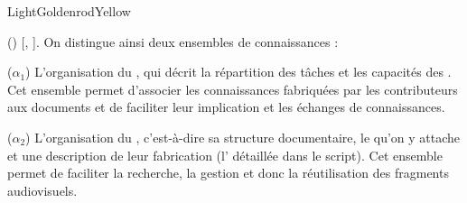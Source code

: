 \begin{problemes}{LightGoldenrodYellow}
\begin{liste}
 	\item[(\g{$\alpha$})]  [, ]. 
 	On distingue ainsi deux ensembles de connaissances : 
 	\begin{listeni} 
 		\item[($\alpha_1$)] L'organisation du , qui décrit la répartition des tâches et  les capacités des .
 		Cet ensemble permet d'associer les connaissances fabriquées par les contributeurs aux documents et de faciliter leur implication et les échanges de connaissances.
 		
 		\item[($\alpha_2$)] L'organisation du , c'est-à-dire sa structure documentaire, le  qu'on y attache et une description de leur fabrication (l' détaillée dans le script).
 		Cet ensemble permet de faciliter la recherche, la gestion et donc la réutilisation des fragments audiovisuels.
 	\end{listeni}


\end{liste}
\end{problemes}
